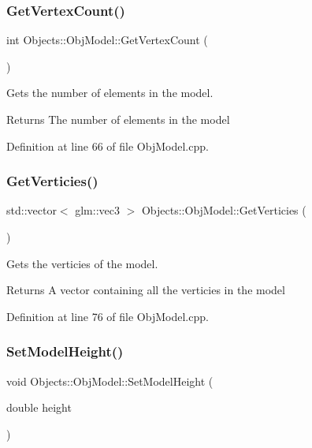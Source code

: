 \subsubsection{\texorpdfstring{Get\+Vertex\+Count()}{GetVertexCount()}}
{\footnotesize\ttfamily int Objects\+::\+Obj\+Model\+::\+Get\+Vertex\+Count (\begin{DoxyParamCaption}{ }\end{DoxyParamCaption})}

Gets the number of elements in the model. \begin{DoxyReturn}{Returns}
The number of elements in the model 
\end{DoxyReturn}


Definition at line 66 of file Obj\+Model.\+cpp.

\mbox{\label{class_objects_1_1_obj_model_a6d17114bb249c782890410c47b568a61}} 
\subsubsection{\texorpdfstring{Get\+Verticies()}{GetVerticies()}}
{\footnotesize\ttfamily std\+::vector$<$ glm\+::vec3 $>$ Objects\+::\+Obj\+Model\+::\+Get\+Verticies (\begin{DoxyParamCaption}{ }\end{DoxyParamCaption})}

Gets the verticies of the model. \begin{DoxyReturn}{Returns}
A vector containing all the verticies in the model 
\end{DoxyReturn}


Definition at line 76 of file Obj\+Model.\+cpp.

\mbox{\label{class_objects_1_1_obj_model_a8dbe139248efa6ed1d9921e141262ee9}} 
\subsubsection{\texorpdfstring{Set\+Model\+Height()}{SetModelHeight()}}
{\footnotesize\ttfamily void Objects\+::\+Obj\+Model\+::\+Set\+Model\+Height (\begin{DoxyParamCaption}\item[{double}]{height }\end{DoxyParamCaption})}

